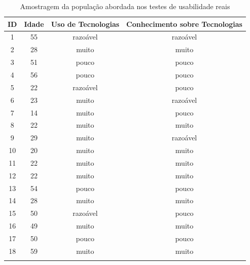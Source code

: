 \documentclass[11pt, a4paper]{article}
\begin{document}
\begin{longtable}[c]{|c|c|c|c|}
\hline
ID & Idade & \cellcolor[HTML]{FFFFFF}Uso de Tecnologias & Conhecimento sobre Tecnologias \\ \hline
\endfirsthead
%
\endhead
%
1  & 55    & razoável                                   & razoável                       \\ \hline
2  & 28    & muito                                      & muito                          \\ \hline
3  & 51    & pouco                                      & pouco                          \\ \hline
4  & 56    & pouco                                      & pouco                          \\ \hline
5  & 22    & razoável                                   & pouco                          \\ \hline
6  & 23    & muito                                      & razoável                       \\ \hline
7  & 14    & muito                                      & pouco                          \\ \hline
8  & 22    & muito                                      & muito                          \\ \hline
9  & 29    & muito                                      & razoável                       \\ \hline
10 & 20    & muito                                      & muito                          \\ \hline
11 & 22    & muito                                      & muito                          \\ \hline
12 & 22    & muito                                      & muito                          \\ \hline
13 & 54    & pouco                                      & pouco                          \\ \hline
14 & 28    & muito                                      & muito                          \\ \hline
15 & 50    & razoável                                   & pouco                          \\ \hline
16 & 49    & muito                                      & muito                          \\ \hline
17 & 50    & pouco                                      & pouco                          \\ \hline
18 & 59    & muito                                      & muito                          \\ \hline
\caption{Amostragem da população abordada nos testes de usabilidade reais}
\label{tab:realTest}\\
\end{longtable}
\end{document}
